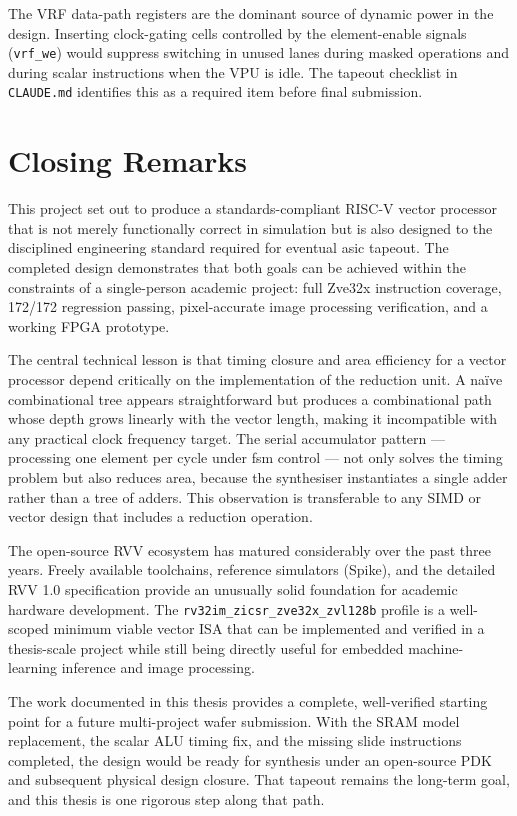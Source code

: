 The VRF data-path registers are the dominant source of dynamic power in the design.
Inserting clock-gating cells controlled by the element-enable signals (\texttt{vrf\_we})
would suppress switching in unused lanes during masked operations and during scalar
instructions when the VPU is idle. The tapeout checklist in \texttt{CLAUDE.md}
identifies this as a required item before final submission.

\section{Closing Remarks}
\label{sec:closing}

This project set out to produce a standards-compliant RISC-V vector processor that is
not merely functionally correct in simulation but is also designed to the disciplined
engineering standard required for eventual \gls{asic} tapeout. The completed design
demonstrates that both goals can be achieved within the constraints of a single-person
academic project: full Zve32x instruction coverage, 172/172 regression passing,
pixel-accurate image processing verification, and a working FPGA prototype.

The central technical lesson is that timing closure and area efficiency for a vector
processor depend critically on the implementation of the reduction unit. A na\"ive
combinational tree appears straightforward but produces a combinational path whose
depth grows linearly with the vector length, making it incompatible with any practical
clock frequency target. The serial accumulator pattern — processing one element per
cycle under \gls{fsm} control — not only solves the timing problem but also reduces
area, because the synthesiser instantiates a single adder rather than a tree of
adders. This observation is transferable to any SIMD or vector design that includes
a reduction operation.

The open-source RVV ecosystem has matured considerably over the past three years.
Freely available toolchains, reference simulators (Spike), and the detailed RVV 1.0
specification provide an unusually solid foundation for academic hardware development.
The \texttt{rv32im\_zicsr\_zve32x\_zvl128b} profile is a well-scoped minimum viable
vector ISA that can be implemented and verified in a thesis-scale project while still
being directly useful for embedded machine-learning inference and image processing.

The work documented in this thesis provides a complete, well-verified starting point
for a future multi-project wafer submission. With the SRAM model replacement, the
scalar ALU timing fix, and the missing slide instructions completed, the design would
be ready for synthesis under an open-source PDK and subsequent physical design closure.
That tapeout remains the long-term goal, and this thesis is one rigorous step along
that path.
